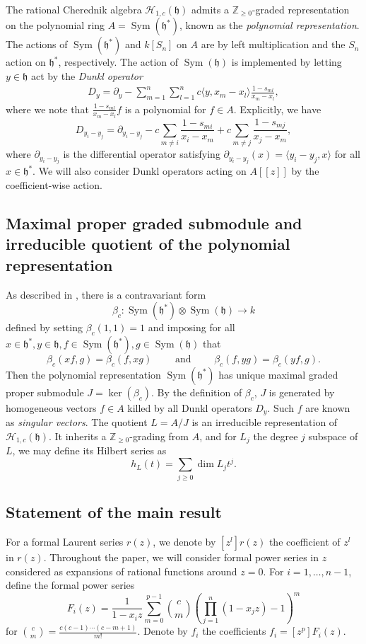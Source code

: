\documentclass{amsart}
\numberwithin{equation}{section}
\theoremstyle{definition}
\newcommand{\ZZ}{\mathbb{Z}}
\newcommand{\h}{\mathfrak{h}}
\newcommand{\HH}{\mathcal{H}}
\newcommand{\Sym}{\operatorname{Sym}}
\begin{document}
The rational Cherednik algebra $\HH_{1, c}(\h)$ admits a $\ZZ_{\geq 0}$-graded representation on the polynomial ring $A = \Sym(\h^*)$, known as the \textit{polynomial representation}.  The actions of $\Sym(\h^*)$ and $k[S_n]$ on $A$ are by left multiplication and the $S_n$ action on $\h^*$, respectively.  The action of $\Sym(\h)$ is implemented by letting $y \in \h$ act by the \textit{Dunkl operator}
\begin{align*}
D_y =  \partial_y  - \sum_{m=1}^{n} \sum_{l=1}^{n} c  \langle y, x_m-x_l \rangle \frac{1-s_{ml}}{x_m - x_l},
\end{align*}
where we note that $\frac{1-s_{ml}}{x_m - x_l}f$ is a polynomial for $f \in A$. Explicitly, we have  
\[
D_{y_i - y_j} =  \partial_{y_i-y_j}-c\sum_{m \ne i} \frac{1-s_{mi}}{x_i-x_m}+c\sum_{m \ne j} \frac{1-s_{mj}}{x_j-x_m},
\] \noindent
where $\partial_{y_i-y_j}$ is the differential operator satisfying $\partial_{y_i-y_j}(x) = \langle y_i-y_j,x\rangle$ for all $x \in \h^*$.  We will also consider Dunkl operators acting on $A[[z]]$ by the coefficient-wise action.

\subsection{Maximal proper graded submodule and irreducible quotient of the polynomial representation}

As described in \cite[Section 2.5]{BC1}, there is a contravariant form 
\[
\beta_c: \Sym(\h^*) \otimes \Sym(\h) \to k
\]
defined by setting $\beta_c(1, 1) = 1$ and imposing for all $x \in \h^*, y \in \h, f \in \Sym(\h^*), g \in \Sym(\h)$ that
\[
\beta_c(xf,g)=\beta_c(f,xg) \qquad \text{ and } \qquad \beta_c(f,yg) = \beta_c(yf,g).
\]
Then the polynomial representation $\Sym(\h^*)$ has unique maximal graded proper submodule $J = \ker(\beta_c)$.  By the definition of $\beta_c$, $J$ is generated by homogeneous vectors $f \in A$ killed by all Dunkl operators $D_y$.  Such $f$ are known as \textit{singular vectors}.  The quotient $L = A/J$ is an irreducible representation of $\HH_{1,c}(\h)$.  It inherits a $\ZZ_{\geq 0}$-grading from $A$, and for $L_j$ the degree $j$ subspace of $L$, we may define its Hilbert series as
\[
h_L(t) = \sum_{j \geq 0} \dim L_j t^j.
\]

\subsection{Statement of the main result}

For a formal Laurent series $r(z)$, we denote by $[z^l] r(z)$ the coefficient of $z^l$ in $r(z)$.  Throughout the paper, we will consider formal power series in $z$ considered as expansions of rational functions around $z = 0$. For $i = 1, \ldots, n - 1$, define the formal power series
\[
F_i(z)=\frac{1}{1-x_iz} \sum_{m=0}^{p-1} \binom{c}{m}\left(\prod_{j=1}^{n} (1-x_jz) - 1\right)^m
\]
for $\binom{c}{m} = \frac{c (c - 1) \cdots (c - m + 1)}{m!}$.  Denote by $f_i$ the coefficients $f_i = [z^p] F_i(z)$.
\end{document}
